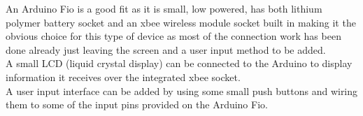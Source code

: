 An Arduino Fio is a good fit as it is small, low powered, has both lithium polymer battery socket and an xbee wireless module socket built in making it the obvious choice for this type of device as most of the connection work has been done already just leaving the screen and a user input method to be added.
\\A small LCD (liquid crystal display) can be connected to the Arduino to display information it receives over the integrated xbee socket.
\\A user input interface can be added by using some small push buttons and wiring them to some of the input pins provided on the Arduino Fio.

